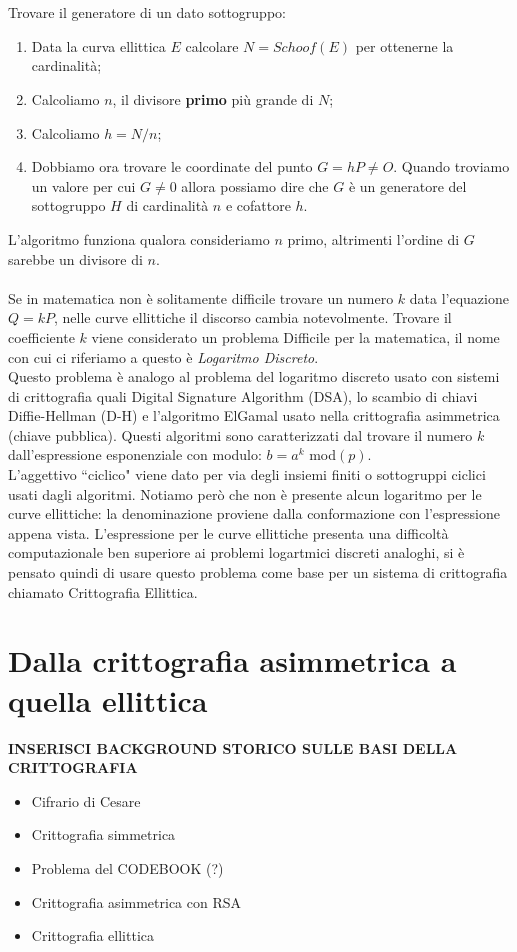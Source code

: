 \documentclass[a4paper,12pt]{tesiinfo}
\begin{document}
\\
\\
 Trovare il generatore di un dato sottogruppo:
\begin{enumerate}
 \item Data la curva ellittica $E$ calcolare $N = Schoof(E)$ per ottenerne la cardinalit\`a;
 \item Calcoliamo $n$, il divisore \textbf{primo} pi\`u grande di $N$;
 \item Calcoliamo $h = N \big / n$;
 \item Dobbiamo ora trovare le coordinate del punto $G = hP \ne O$. Quando troviamo un valore per cui $G \ne 0$ allora possiamo dire che $G$ \`e un generatore del sottogruppo $H$ di cardinalit\`a $n$ e cofattore $h$.
\end{enumerate}
L'algoritmo funziona qualora consideriamo $n$ primo, altrimenti l'ordine di $G$ sarebbe un divisore di $n$.
\\
\\
Se in matematica non \`e solitamente difficile trovare un numero $k$ data l'equazione $Q = kP$, nelle curve ellittiche il discorso cambia notevolmente. Trovare il coefficiente $k$ viene considerato un problema Difficile per la matematica, il nome con cui ci riferiamo a questo \`e \textit{Logaritmo Discreto}.
\\
Questo problema \`e analogo al problema del logaritmo discreto usato con sistemi di crittografia quali Digital Signature Algorithm (DSA), lo scambio di chiavi Diffie-Hellman (D-H) e l'algoritmo ElGamal usato nella crittografia asimmetrica (chiave pubblica). Questi algoritmi sono caratterizzati dal trovare il numero $k$ dall'espressione esponenziale con modulo: $b = a^k$ mod$(p)$. 
\\
L'aggettivo ``ciclico" viene dato per via degli insiemi finiti o sottogruppi ciclici usati dagli algoritmi. Notiamo per\`o che non \`e presente alcun logaritmo per le curve ellittiche: la denominazione proviene dalla conformazione con l'espressione appena vista. L'espressione per le curve ellittiche presenta una difficolt\`a computazionale ben superiore ai problemi logartmici discreti analoghi, si \`e pensato quindi di usare questo problema come base per un sistema di crittografia chiamato Crittografia Ellittica.
%
%
%
%
%
\chapter{Dalla crittografia asimmetrica a quella ellittica}
\textbf{INSERISCI BACKGROUND STORICO SULLE BASI DELLA CRITTOGRAFIA }
\begin{itemize}
 \item Cifrario di Cesare
 \item Crittografia simmetrica
 \item Problema del CODEBOOK (?)
 \item Crittografia asimmetrica con RSA
 \item Crittografia ellittica
\end{itemize}
\noindent\makebox[\linewidth]{\rule{\paperwidth}{0.4pt}}
\\
\\
\end{document}
